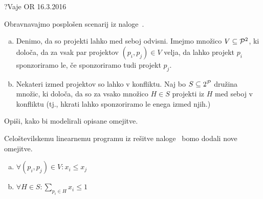 \begin{naloga}{?}{Vaje OR 16.3.2016}
\begin{vprasanje}
Obravnavajmo posplošen scenarij iz naloge~.
\begin{enumerate}[(a)]
\item Denimo, da so projekti lahko med seboj odvisni.
Imejmo množico $V \subseteq \mathcal{P}^2$, ki določa,
da za vsak par projektov $(p_i, p_j) \in V$ velja,
da lahko projekt $p_i$ sponzoriramo le,
če sponzoriramo tudi projekt $p_j$.

\item Nekateri izmed projektov so lahko v konfliktu.
Naj bo $S \subseteq 2^{\mathcal{P}}$ družina množic, ki določa,
da so za vsako množico $H \in S$ projekti iz $H$ med seboj v konfliktu
(tj., hkrati lahko sponzoriramo le enega izmed njih.)
\end{enumerate}
Opiši, kako bi modelirali opisane omejitve.
\end{vprasanje}

\begin{odgovor}
Celoštevilskemu linearnemu programu iz rešitve naloge~
bomo dodali nove omejitve.
\begin{enumerate}[(a)]
\item $\displaystyle \forall (p_i, p_j) \in V : x_i \le x_j$
\item $\displaystyle \forall H \in S : \sum_{p_i \in H} x_i \le 1$
\end{enumerate}
\end{odgovor}
\end{naloga}


